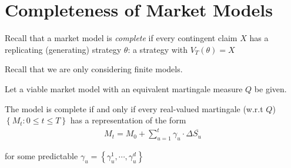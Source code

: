 \section{Completeness of Market Models}
\noindent Recall that a market model is \textit{complete} if every contingent claim $X$ has a replicating (generating) strategy $\theta$: a strategy with $V_T(\theta) = X$
\par\bigskip
\noindent Recall that we are only considering finite models.
\par\bigskip
\begin{lem}[]{}
  Let a viable market model with an equivalent martingale measure $Q$ be given.\par
\noindent The model is complete if and only if every real-valued martingale (w.r.t $Q$) $\left\{M_t:0\leq t\leq T\right\}$ has a representation of the form
\begin{equation*}
  \begin{gathered}
    M_t = M_0+\sum_{u=1}^{t}\gamma_u\cdot\Delta\overline{S_u}
  \end{gathered}
\end{equation*}\par
\noindent for some predictable $\gamma_u = \left\{\gamma_u^1,\cdots, \gamma_u^d\right\}$
\end{lem}
\par\bigskip
